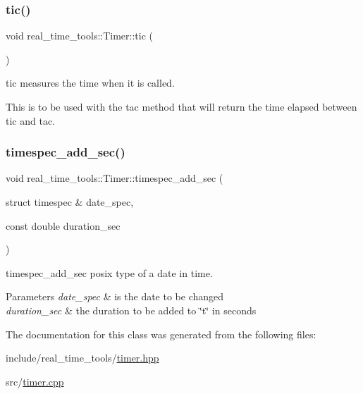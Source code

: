 \subsubsection{\texorpdfstring{tic()}{tic()}}
{\footnotesize\ttfamily void real\+\_\+time\+\_\+tools\+::\+Timer\+::tic (\begin{DoxyParamCaption}{ }\end{DoxyParamCaption})}



tic measures the time when it is called. 

This is to be used with the tac method that will return the time elapsed between tic and tac. \mbox{\label{classreal__time__tools_1_1Timer_a0055b704a4e0b518269b0ab5fbed9278}} 
\subsubsection{\texorpdfstring{timespec\+\_\+add\+\_\+sec()}{timespec\_add\_sec()}}
{\footnotesize\ttfamily void real\+\_\+time\+\_\+tools\+::\+Timer\+::timespec\+\_\+add\+\_\+sec (\begin{DoxyParamCaption}\item[{struct timespec \&}]{date\+\_\+spec,  }\item[{const double}]{duration\+\_\+sec }\end{DoxyParamCaption})\hspace{0.3cm}{\ttfamily [static]}}



timespec\+\_\+add\+\_\+sec posix type of a date in time. 


\begin{DoxyParams}{Parameters}
{\em date\+\_\+spec} & is the date to be changed \\
\hline
{\em duration\+\_\+sec} & the duration to be added to \char`\"{}t\char`\"{} in seconds \\
\hline
\end{DoxyParams}


The documentation for this class was generated from the following files\+:\begin{DoxyCompactItemize}
\item 
include/real\+\_\+time\+\_\+tools/\hyperlink{timer_8hpp}{timer.\+hpp}\item 
src/\hyperlink{timer_8cpp}{timer.\+cpp}\end{DoxyCompactItemize}

